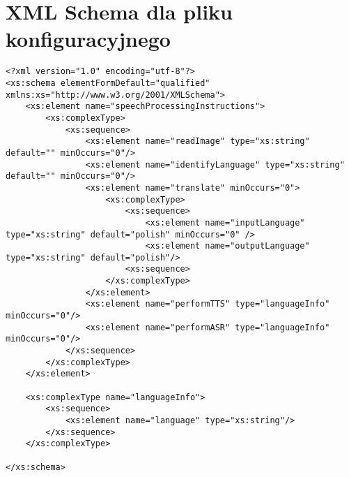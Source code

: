 \documentclass[a4paper, twoside,11pt, openright]{Latex/Classes/PhDthesisPSnPDF}
\begin{document}




%



\listoffigures	%
\renewcommand{\lstlistlistingname}{Spis fragmentów kodu}
\lstlistoflistings
{}

\listoftables  %

\lstset{language=XML, tabsize=4,caption=XML Schema dla pliku konfiguracyjnego,label=lst:xml_schema}
\appendix
\chapter{XML Schema dla pliku konfiguracyjnego}
\begin{lstlisting}
<?xml version="1.0" encoding="utf-8"?>
<xs:schema elementFormDefault="qualified" xmlns:xs="http://www.w3.org/2001/XMLSchema">
	<xs:element name="speechProcessingInstructions">
		<xs:complexType>
			<xs:sequence>
				<xs:element name="readImage" type="xs:string" default="" minOccurs="0"/>
				<xs:element name="identifyLanguage" type="xs:string" default="" minOccurs="0"/>
				<xs:element name="translate" minOccurs="0">
					<xs:complexType>
						<xs:sequence>
							<xs:element name="inputLanguage" type="xs:string" default="polish" minOccurs="0" />
							<xs:element name="outputLanguage" type="xs:string" default="polish"/>
						<xs:sequence>
					</xs:complexType>
				</xs:element>
				<xs:element name="performTTS" type="languageInfo" minOccurs="0"/>
				<xs:element name="performASR" type="languageInfo" minOccurs="0"/>
			</xs:sequence>
		</xs:complexType>
	</xs:element>
			
	<xs:complexType name="languageInfo">
		<xs:sequence>
			<xs:element name="language" type="xs:string"/>
		</xs:sequence>
	</xs:complexType>
	
</xs:schema>

\end{lstlisting}
\end{document}
